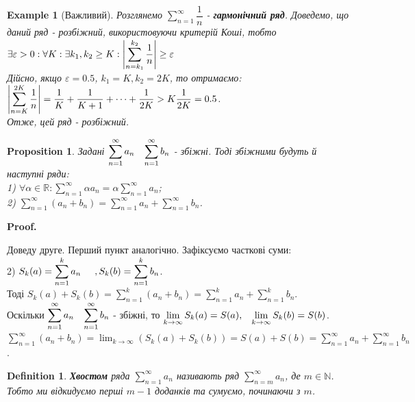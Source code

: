 \documentclass[a4paper, 10pt]{article}
\makeatletter
\def\huge{\displaystyle}
\def\qed{$\blacksquare$}
\theoremstyle{theoremdd}
\theoremstyle{theoremdd}
\newtheorem{definition}[theorem]{Definition}
\theoremstyle{theoremdd}
\theoremstyle{theoremdd}
\newtheorem{example}[theorem]{Example}
\theoremstyle{theoremdd}
\newtheorem{proposition}[theorem]{Proposition}
\theoremstyle{theoremdd}
\theoremstyle{theoremdd}
\theoremstyle{theoremdd}
\renewenvironment{proof}[1][Proof.\\]{\par
\pushQED{\hfill \qed}%
\normalfont \topsep6\p@\@plus6\p@\relax
\trivlist
\item\relax
{\bfseries
#1\@addpunct{.}}\hspace\labelsep\ignorespaces
}{%
\popQED\endtrivlist\@endpefalse
}
\makeatother
\begin{document}
\begin{example}[Важливий]
Розглянемо $\huge \sum_{n=1}^{\infty} \dfrac{1}{n}$ - \textbf{гармонічний ряд}. Доведемо, що даний ряд - розбіжний, використовуючи критерій Коші, тобто\\
$\exists \varepsilon > 0: \forall K: \exists k_1,k_2 \geq K: \huge \abs{\sum_{n=k_1}^{k_2} \dfrac{1}{n}} \geq \varepsilon$\\
Дійсно, якщо $\varepsilon = 0.5$, $k_1 = K, k_2 = 2K$, то отримаємо:\\
$\huge \abs{\sum_{n=K}^{2K} \dfrac{1}{n}} = \dfrac{1}{K} + \dfrac{1}{K+1} + \dots + \dfrac{1}{2K} > K \dfrac{1}{2K} = 0.5$.\\
Отже, цей ряд - розбіжний.
\end{example}

\begin{proposition}
Задані $\huge \sum_{n=1}^{\infty} a_n \hspace{0.3cm} \sum_{n=1}^{\infty} b_n$ - збіжні. Тоді збіжними будуть й наступні ряди:\\
1) $\forall \alpha \in \mathbb{R}: \huge \sum_{n=1}^{\infty} \alpha a_n = \alpha \sum_{n=1}^\infty a_n$;\\
2) $\huge \sum_{n=1}^{\infty} (a_n+b_n) = \sum_{n=1}^{\infty} a_n + \sum_{n=1}^{\infty} b_n$.
\end{proposition}

\begin{proof}
Доведу друге. Перший пункт аналогічно. Зафіксуємо часткові суми:\\
2) $\huge S_k(a) = \sum_{n=1}^k a_n \hspace{0.5cm}, S_k(b) = \sum_{n=1}^k b_n$.\\
Тоді $S_k(a) + S_k(b) = \huge \sum_{n=1}^k (a_n+b_n) = \sum_{n=1}^k a_n + \sum_{n=1}^k b_n$.\\
Оскільки $\huge \sum_{n=1}^{\infty} a_n \hspace{0.3cm} \sum_{n=1}^{\infty} b_n$ - збіжні, то $\huge \lim_{k \to \infty} S_k(a) = S(a), \hspace{0.3cm} \huge \lim_{k \to \infty} S_k(b) = S(b)$.\\
$\huge \sum_{n=1}^{\infty} (a_n+b_n) = \lim_{k \to \infty} (S_k(a) + S_k(b)) = S(a) + S(b) = \sum_{n=1}^{\infty} a_n + \sum_{n=1}^{\infty} b_n$.\\
\end{proof}

\begin{definition}
\textbf{Хвостом} ряда $\huge \sum_{n=1}^\infty a_n$ називають ряд $\huge \sum_{n=m}^{\infty} a_n$, де $m \in \mathbb{N}$.\\
Тобто ми відкидуємо перші $m-1$ доданків та сумуємо, починаючи з $m$.
\end{definition}
\end{document}
